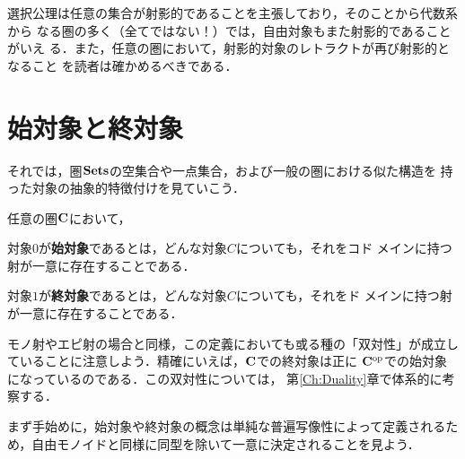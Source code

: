選択公理は任意の集合が射影的であることを主張しており，そのことから代数系から
なる圏の多く（全てではない！）では，自由対象もまた射影的であることがいえ
る．また，任意の圏において，射影的対象のレトラクトが再び射影的となること
を読者は確かめるべきである．
\section{始対象と終対象}
\label{Ch:initial and terminal objects}
それでは，圏$\mathbf{Sets}$の空集合や一点集合，および一般の圏における似た構造を
持った対象の抽象的特徴付けを見ていこう．

\begin{definition}
 任意の圏${\bf C}$において，
 
 対象$0$が{\bfseries 始対象}であるとは，どんな対象$C$についても，それをコド
 メインに持つ射が一意に存在することである．
 \begin{center}
 \end{center} 

 対象$1$が{\bfseries 終対象}であるとは，どんな対象$C$についても，それをド
 メインに持つ射が一意に存在することである．
 \begin{center}
 \end{center} 
\end{definition}

モノ射やエピ射の場合と同様，この定義においても或る種の「双対性」が成立し
ていることに注意しよう．精確にいえば，${\bf C}$での終対象は正に
${\bf C}^{\rm op}$での始対象になっているのである．この双対性については，
第\ref{Ch:Duality}章で体系的に考察する．

まず手始めに，始対象や終対象の概念は単純な普遍写像性によって定義されるた
め，自由モノイドと同様に同型を除いて一意に決定されることを見よう．

